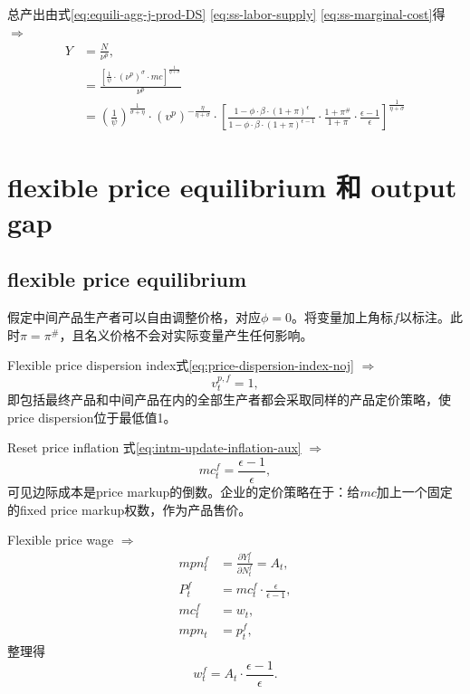 总产出由式\eqref{eq:equili-agg-j-prod-DS}   \eqref{eq:ss-labor-supply}   \eqref{eq:ss-marginal-cost}得 $\Rightarrow$
\begin{align}
  \label{eq:ss-agg-output}
  Y &= \frac{N}{\nu^p},\nonumber \\
      &= \frac{\left[ \frac{1}{\psi} \cdot \left( \nu^p \right)^{\sigma} \cdot mc \right] ^{\frac{1}{\eta + \sigma}}}{\nu^p} \nonumber \\
      &= \left(\frac{1}{\psi}\right)^{\frac{1}{\sigma + \eta}} \cdot \left( v^p \right)^{-\frac{\eta}{\eta + \sigma}} \cdot
        \left[
        \frac{1-\phi \cdot \beta \cdot (1+\pi)^{\epsilon}}{1-\phi \cdot \beta \cdot (1+\pi)^{\epsilon-1}} \cdot \frac{1+\pi^{\#}}{1+\pi} \cdot \frac{\epsilon -1}{\epsilon}
        \right]^{\frac{1}{\eta + \sigma}}
\end{align}

\section{flexible price equilibrium 和 output gap}
\label{sec:flexible-price-output-gap}
\subsection{flexible price equilibrium}
\label{sec:flexible-price}

假定中间产品生产者可以自由调整价格，对应$\phi = 0$。将变量加上角标$f$以标注。此时$\pi = \pi^{\#}$，且名义价格不会对实际变量产生任何影响。

Flexible price dispersion index式\eqref{eq:price-dispersion-index-noj} $\Rightarrow$
\begin{equation}
  \label{eq:flexible-price-dispersion-index}
  v_t^{p,f} = 1,
\end{equation}
即包括最终产品和中间产品在内的全部生产者都会采取同样的产品定价策略，使price dispersion位于最低值1。

Reset price inflation 式\eqref{eq:intm-update-inflation-aux} $\Rightarrow$
\begin{equation}
  \label{eq:flexible-price-marg-cost}
  mc_t^f = \frac{\epsilon - 1}{\epsilon},
\end{equation}
可见边际成本是price markup的倒数。企业的定价策略在于：给$mc$加上一个固定的fixed price markup权数，作为产品售价。

Flexible price wage $\Rightarrow$
\begin{align*}
  mpn_t^f &= \frac{\partial Y_t^f}{\partial N_t^f} = A_t, \\
  P_t^f &= mc_t^f \cdot \frac{\epsilon}{\epsilon-1},\\
  mc_t^f &= w_t,\\
  mpn_t &= p_t^f,
\end{align*}
整理得
\begin{equation}
  \label{eq:flexible-price-wage}
  w_t^f = A_t \cdot \frac{\epsilon-1}{\epsilon}.
\end{equation}

